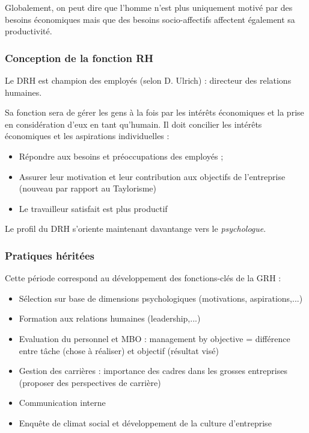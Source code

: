 \documentclass[12pt]{article}
\begin{document}
	  Globalement, on peut dire que l'homme n'est plus uniquement motivé par des besoins économiques mais que des besoins socio-affectifs affectent également sa productivité.
	  
	  
	  \subsubsection{Conception de la fonction RH}
	  
	  Le DRH est \og{} champion des employés\fg{} (selon D. Ulrich) : directeur des relations humaines.
	  
	  Sa fonction sera de gérer les gens à la fois par les intérêts économiques et la prise en considération d'eux en tant qu'humain. Il doit concilier les intérêts économiques et les aspirations individuelles :
	  
	  \begin{itemize}
	   \item Répondre aux besoins et préoccupations des employés ;
	   \item Assurer leur motivation et leur contribution aux objectifs de l'entreprise (nouveau par rapport au Taylorisme)
	   \item Le travailleur satisfait est plus productif
	  \end{itemize}
	  
	  Le profil du DRH s'oriente maintenant davantange vers le \emph{psychologue}.
	  
	  \subsubsection{Pratiques héritées}
	  
	  Cette période correspond au développement des fonctions-clés de la GRH :
	  
	  \begin{itemize}
	   \item Sélection sur base de dimensions psychologiques (motivations, aspirations,...)
	   \item Formation aux relations humaines (leadership,...)
	   \item Evaluation du personnel et MBO : management by objective = différence entre tâche (chose à réaliser) et objectif (résultat visé)
	   \item Gestion des carrières : importance des cadres dans les grosses entreprises (proposer des perspectives de carrière)
	   \item Communication interne
	   \item Enquête de climat social et développement de la culture d'entreprise
	  \end{itemize}
	  
\end{document}
